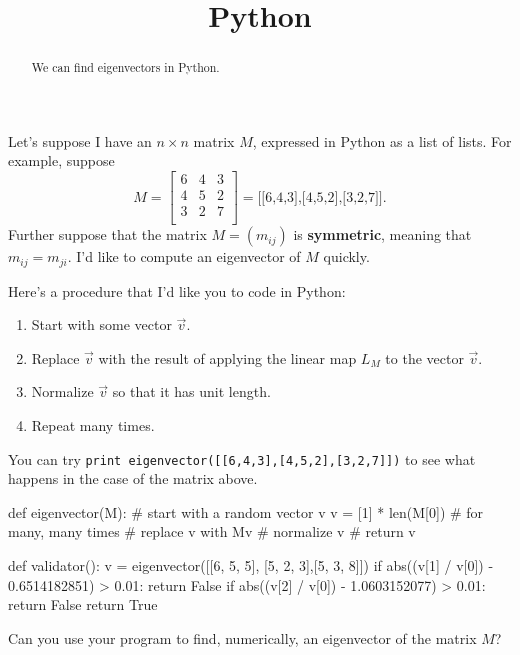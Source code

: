 \documentclass{ximera}
\title{Python}
\begin{document}
\begin{abstract}
  We can find eigenvectors in Python.
\end{abstract}\maketitle

Let's suppose I have an $n \times n$ matrix $M$, expressed in Python as a list of lists.  For example, suppose
$$
M = \begin{bmatrix}
6 & 4 & 3 \\
4 & 5 & 2 \\
3 & 2 & 7 \\
\end{bmatrix} = \text{[[6,4,3],[4,5,2],[3,2,7]]}.
$$
Further suppose that the matrix $M = (m_{ij})$ is \textbf{symmetric},
meaning that $m_{ij} = m_{ji}$.  I'd like to compute an eigenvector of
$M$ quickly.

\begin{question}
  Here's a procedure that I'd like you to code in Python:
  \begin{enumerate}
  \item Start with some vector $\vec{v}$.
  \item Replace $\vec{v}$ with the result of applying the linear map $L_M$ to the vector $\vec{v}$.
  \item Normalize $\vec{v}$ so that it has unit length.
  \item Repeat many times.
  \end{enumerate}

  You can try \texttt{print eigenvector([[6,4,3],[4,5,2],[3,2,7]])} to
  see what happens in the case of the matrix above.

  \begin{solution}
    \begin{python}
def eigenvector(M):
  # start with a random vector v
  v = [1] * len(M[0])
  # for many, many times
  #   replace v with Mv
  #   normalize v
  # return v 

def validator():
  v = eigenvector([[6, 5, 5], [5, 2, 3],[5, 3, 8]])
  if abs((v[1] / v[0]) - 0.6514182851) > 0.01:
    return False
  if abs((v[2] / v[0]) - 1.0603152077) > 0.01:
    return False
  return True
    \end{python}
  \end{solution}

Can you use your program to find, numerically, an eigenvector of the matrix $M$?

\end{question}
\end{document}
